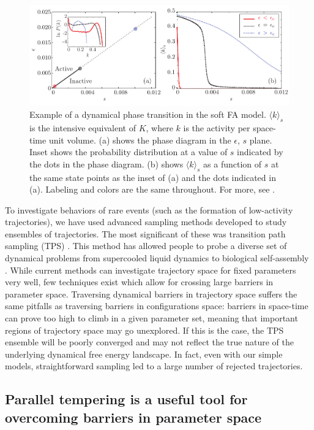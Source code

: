 \documentclass[11pt]{article}
\begin{document}
\begin{figure}[b!] %
   \centering
   \includegraphics[width=5in]{softFA.pdf} 
   \caption{Example of a dynamical phase transition in the soft FA model. $\langle k \rangle_{s}$ is the intensive equivalent of $K$, where $k$ is the activity per space-time unit volume.  (a) shows the phase diagram in the $\epsilon$, $s$ plane.  Inset shows the probability distribution at a value of $s$ indicated by the dots in the phase diagram. (b) shows $\langle k \rangle_{s}$ as a function of $s$ at the same state points as the inset of (a) and the dots indicated in (a).  Labeling and colors are the same throughout.  For more, see \cite{Elmatad_PNAS_2010}.}
   \label{fig:softFA}
\end{figure}

To investigate behaviors of rare events (such as the formation of low-activity trajectories), we have used advanced sampling methods developed to study ensembles of trajectories. The most significant of these was transition path sampling (TPS) \cite{Bolhuis_AnnuRevPhysChem_2002}.  This method has allowed people to probe a diverse set of dynamical problems from supercooled liquid dynamics \cite{Merolle_PNAS_Aug_2005} to biological self-assembly \cite{TenWolde2002}. While current methods can investigate trajectory space for fixed parameters very well, few techniques exist which allow for crossing large barriers  in parameter space. Traversing dynamical barriers in trajectory space suffers the same pitfalls as traversing barriers in configurations space: barriers in space-time can prove too high to climb in a given parameter set, meaning that important regions of trajectory space may go unexplored.  If this is the case, the TPS ensemble will be poorly converged and may not reflect the true nature of the underlying dynamical free energy landscape. In fact, even with our simple models, straightforward sampling led to a large number of rejected trajectories.

\subsection*{Parallel tempering is a useful tool for overcoming barriers in parameter space}
\end{document}
